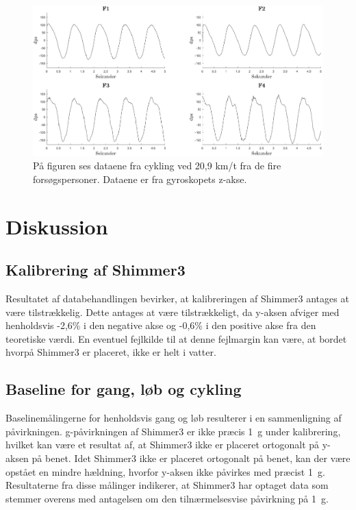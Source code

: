 \begin{figure}[H]
	\centering
	\includegraphics[width=1\textwidth]{figures/qBilag/cykling_gyro}
	\caption{På figuren ses dataene fra cykling ved 20,9 km/t fra de fire forsøgspersoner. Dataene er fra gyroskopets z-akse.}
	\label{fig:Ap_cykling3}
\end{figure}\vspace{-.25cm}

\section{Diskussion}
\subsection{Kalibrering af Shimmer3}
Resultatet af databehandlingen bevirker, at kalibreringen af Shimmer3 antages at være tilstrækkelig. Dette antages at være tilstrækkeligt, da y-aksen afviger med henholdsvis -2,6\% i den negative akse og -0,6\% i den positive akse fra den teoretiske værdi. En eventuel fejlkilde til at denne fejlmargin kan være, at bordet hvorpå Shimmer3 er placeret, ikke er helt i vatter.

\subsection{Baseline for gang, løb og cykling}
Baselinemålingerne for henholdsvis gang og løb resulterer i en sammenligning af påvirkningen. g-påvirkningen af Shimmer3 er ikke præcis 1~g under kalibrering, hvilket kan være et resultat af, at Shimmer3 ikke er placeret ortogonalt på y-aksen på benet. Idet Shimmer3 ikke er placeret ortogonalt på benet, kan der være opstået en mindre hældning, hvorfor y-aksen ikke påvirkes med præcist 1~g. Resultaterne fra disse målinger indikerer, at Shimmer3 har optaget data som stemmer overens med antagelsen om den tilnærmelsesvise påvirkning på 1~g. 

